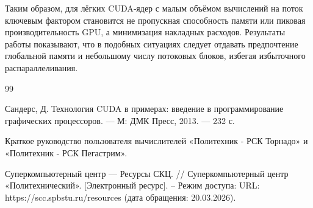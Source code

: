 \documentclass{article}[14pt]
\begin{document}
Таким образом, для лёгких CUDA‑ядер с малым объёмом вычислений на поток ключевым фактором становится не пропускная способность памяти или пиковая производительность GPU, а минимизация накладных расходов. Результаты работы показывают, что в подобных ситуациях следует отдавать предпочтение глобальной памяти и небольшому числу потоковых блоков, избегая избыточного распараллеливания.

\pagebreak

\begin{thebibliography}{99}

 Сандерс, Д. Технология CUDA в примерах: введение в программирование графических процессоров. — М: ДМК Пресс, 2013. — 232 с.

 Краткое руководство пользователя вычислителей «Политехник - РСК Торнадо» и «Политехник - РСК Пегастрим».

 Суперкомпьютерный центр — Ресурсы СКЦ. // Суперкомпьютерный центр «Политехнический». [Электронный ресурс]. – Режим доступа: URL: https://scc.spbstu.ru/resources (дата обращения: 20.03.2026).

\end{thebibliography}
\end{document}
